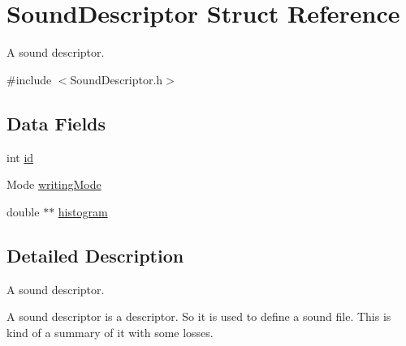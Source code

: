 \hypertarget{structSoundDescriptor}{\section{Sound\-Descriptor Struct Reference}
\label{structSoundDescriptor}
}


A sound descriptor.  




{\ttfamily \#include $<$Sound\-Descriptor.\-h$>$}

\subsection*{Data Fields}
\begin{DoxyCompactItemize}
\item 
int \hyperlink{structSoundDescriptor_a0e74167c9c85b5696a4b64dd16af30c6}{id}
\item 
Mode \hyperlink{structSoundDescriptor_a6bda0da57e7a82c0e7c20b22f26b6c1c}{writing\-Mode}
\item 
double $\ast$$\ast$ \hyperlink{structSoundDescriptor_a677e9fb3556058648bf4f114e81abc8f}{histogram}
\end{DoxyCompactItemize}


\subsection{Detailed Description}
A sound descriptor. 

A sound descriptor is a descriptor. So it is used to define a sound file. This is kind of a summary of it with some losses. 

